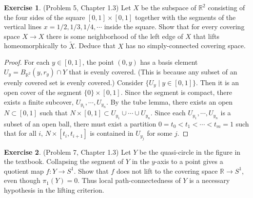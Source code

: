\documentclass[12pt, psamsfonts]{amsart}
\theoremstyle{definition}
\newtheorem*{exer}{Exercise}
\theoremstyle{remark}
\numberwithin{equation}{section}
\begin{document}
\begin{exer}{(Problem 5, Chapter 1.3)}
  Let $X$ be the subspace of $\mathbb{R}^2$ consisting of the four sides of the square $[0, 1] \times [0, 1]$ together with the segments of the vertical lines $x = 1/2, 1/3, 1/4, \cdots$ inside the square.
  Show that for every covering space $X \rightarrow X$ there is some neighborhood of the left edge of $X$ that lifts homeomorphically to $\tilde{X}$.
  Deduce that $X$ has no simply-connected covering space.
\end{exer}

\begin{proof}
  For each $y \in [0, 1]$, the point $(0, y)$ has a basis element $U_y = B_{\mathbb{R}^2}(y, r_y) \cap Y$ that is evenly covered.
  (This is because any subset of an evenly covered set is evenly covered.)
  Consider $\{ U_y \mid y \in [0, 1] \}$.
  Then it is an open cover of the segment $\{ 0 \} \times [0, 1]$.
  Since the segment is compact, there exists a finite subcover, $U_{y_1}, \cdots, U_{y_n}$.
  By the tube lemma, there exists an open $N \subset [0, 1]$ such that $N \times [0, 1] \subset U_{y_1} \cup \cdots \cup U_{y_n}$.
  Since each $U_{y_1}, \cdots, U_{y_n}$ is a subset of an open ball, there must exist a partition $0 = t_0 < t_1 < \cdots < t_m = 1$ such that for all $i$, $N \times [t_i, t_{i + 1}]$ is contained in $U_{y_j}$ for some $j$.
\end{proof}

\begin{exer}{(Problem 7, Chapter 1.3)}
  Let $Y$ be the quasi-circle in the figure in the textbook.
  Collapsing the segment of $Y$ in the $y$-axis to a point gives a quotient map $f: Y \rightarrow S^1$.
  Show that $f$ does not lift to the covering space $\mathbb{R} \rightarrow S^1$, even though $\pi_1(Y) = 0$.
  Thus local path-connectedness of $Y$ is a necessary hypothesis in the lifting criterion.
\end{exer}
\end{document}

